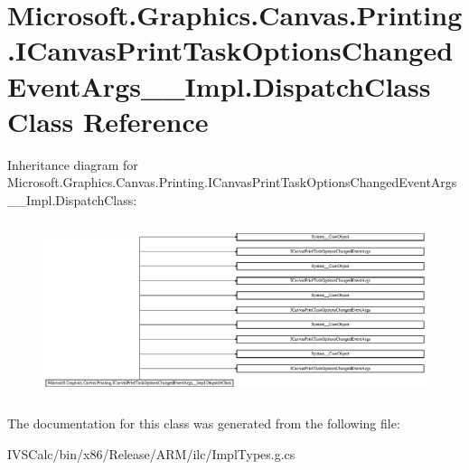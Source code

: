 \hypertarget{class_microsoft_1_1_graphics_1_1_canvas_1_1_printing_1_1_i_canvas_print_task_options_changed_eveb63c021b3953b5726acd0b55f690e5fd}{}\section{Microsoft.\+Graphics.\+Canvas.\+Printing.\+I\+Canvas\+Print\+Task\+Options\+Changed\+Event\+Args\+\_\+\+\_\+\+Impl.\+Dispatch\+Class Class Reference}
\label{class_microsoft_1_1_graphics_1_1_canvas_1_1_printing_1_1_i_canvas_print_task_options_changed_eveb63c021b3953b5726acd0b55f690e5fd}
Inheritance diagram for Microsoft.\+Graphics.\+Canvas.\+Printing.\+I\+Canvas\+Print\+Task\+Options\+Changed\+Event\+Args\+\_\+\+\_\+\+Impl.\+Dispatch\+Class\+:\begin{figure}[H]
\begin{center}
\leavevmode
\includegraphics[height=5.159129cm]{class_microsoft_1_1_graphics_1_1_canvas_1_1_printing_1_1_i_canvas_print_task_options_changed_eveb63c021b3953b5726acd0b55f690e5fd}
\end{center}
\end{figure}


The documentation for this class was generated from the following file\+:\begin{DoxyCompactItemize}
\item 
I\+V\+S\+Calc/bin/x86/\+Release/\+A\+R\+M/ilc/Impl\+Types.\+g.\+cs\end{DoxyCompactItemize}
